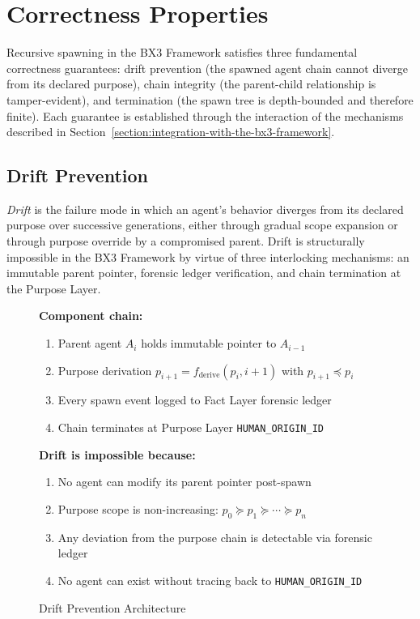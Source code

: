 \section{Correctness Properties}
\label{section:correctness-properties}

Recursive spawning in the BX3 Framework satisfies three fundamental correctness guarantees: drift prevention (the spawned agent chain cannot diverge from its declared purpose), chain integrity (the parent-child relationship is tamper-evident), and termination (the spawn tree is depth-bounded and therefore finite). Each guarantee is established through the interaction of the mechanisms described in Section~\ref{section:integration-with-the-bx3-framework}.

\subsection{Drift Prevention}

\textit{Drift} is the failure mode in which an agent's behavior diverges from its declared purpose over successive generations, either through gradual scope expansion or through purpose override by a compromised parent. Drift is structurally impossible in the BX3 Framework by virtue of three interlocking mechanisms: an immutable parent pointer, forensic ledger verification, and chain termination at the Purpose Layer.

\begin{figure}[ht]
\centering
\caption{Drift Prevention Architecture}
\label{fig:drift-prevention}
\begin{minipage}{0.45\textwidth}
\centering
\textbf{Component chain:}
\begin{enumerate}
\item Parent agent $A_i$ holds immutable pointer to $A_{i-1}$
\item Purpose derivation $p_{i+1} = f_{\text{derive}}(p_i, i+1)$ with $p_{i+1} \preceq p_i$
\item Every spawn event logged to Fact Layer forensic ledger
\item Chain terminates at Purpose Layer \texttt{HUMAN\_ORIGIN\_ID}
\end{enumerate}
\end{minipage}
\hfill
\begin{minipage}{0.45\textwidth}
\centering
\textbf{Drift is impossible because:}
\begin{enumerate}
\item No agent can modify its parent pointer post-spawn
\item Purpose scope is non-increasing: $p_0 \succeq p_1 \succeq \cdots \succeq p_n$
\item Any deviation from the purpose chain is detectable via forensic ledger
\item No agent can exist without tracing back to \texttt{HUMAN\_ORIGIN\_ID}
\end{enumerate}
\end{minipage}
\end{figure}

